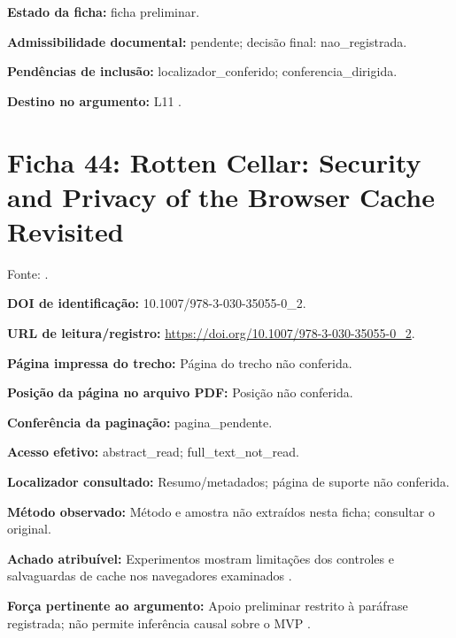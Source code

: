 \noindent\textbf{Estado da ficha:} ficha preliminar.\par\medskip

\noindent\textbf{Admissibilidade documental:} pendente; decisão final: nao\_registrada.\par\medskip

\noindent\textbf{Pendências de inclusão:} localizador\_conferido; conferencia\_dirigida.\par\medskip

\noindent\textbf{Destino no argumento:} L11 .

\clearpage\section*{Ficha 44: Rotten Cellar: Security and Privacy of the Browser Cache Revisited}

Fonte: \citet{OS06}.

\noindent\textbf{DOI de identificação:} 10.1007/978-3-030-35055-0\_2.\par\medskip

\noindent\textbf{URL de leitura/registro:} \url{https://doi.org/10.1007/978-3-030-35055-0_2}.\par\medskip

\noindent\textbf{Página impressa do trecho:} Página do trecho não conferida.\par\medskip

\noindent\textbf{Posição da página no arquivo PDF:} Posição não conferida.\par\medskip

\noindent\textbf{Conferência da paginação:} pagina\_pendente.\par\medskip

\noindent\textbf{Acesso efetivo:} abstract\_read; full\_text\_not\_read.\par\medskip

\noindent\textbf{Localizador consultado:} Resumo/metadados; página de suporte não conferida.\par\medskip

\noindent\textbf{Método observado:} Método e amostra não extraídos nesta ficha; consultar o original.\par\medskip

\noindent\textbf{Achado atribuível:} Experimentos mostram limitações dos controles e salvaguardas de cache nos navegadores examinados \citep{OS06}.\par\medskip

\noindent\textbf{Força pertinente ao argumento:} Apoio preliminar restrito à paráfrase registrada; não permite inferência causal sobre o MVP \citep{OS06}.\par\medskip


